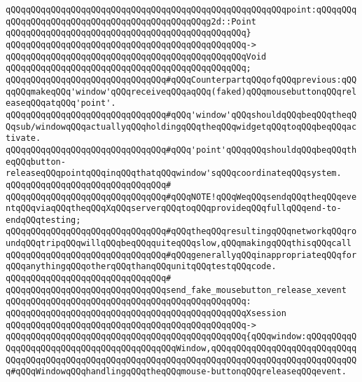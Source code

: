 \verb|qQQqqQQqqQQqqQQqqQQqqQQqqQQqqQQqqQQqqQQqqQQqqQQqqQQqqQQqpoint:qQQqqQQqqQQqqQQqqQQqqQQqqQQqqQQqqQQqqQQqqQQqqQQqg2d::Point|\newline
\verb|qQQqqQQqqQQqqQQqqQQqqQQqqQQqqQQqqQQqqQQqqQQqqQQq}|\newline
\verb|qQQqqQQqqQQqqQQqqQQqqQQqqQQqqQQqqQQqqQQqqQQqqQQq->|\newline
\verb|qQQqqQQqqQQqqQQqqQQqqQQqqQQqqQQqqQQqqQQqqQQqqQQqVoid|\newline
\verb|qQQqqQQqqQQqqQQqqQQqqQQqqQQqqQQqqQQqqQQqqQQqqQQq;|\newline
\newline
\verb|qQQqqQQqqQQqqQQqqQQqqQQqqQQqqQQq#qQQqCounterpartqQQqofqQQqprevious:qQQqqQQqmakeqQQq'window'qQQqreceiveqQQqaqQQq(faked)qQQqmousebuttonqQQqreleaseqQQqatqQQq'point'.|\newline
\verb|qQQqqQQqqQQqqQQqqQQqqQQqqQQqqQQq#qQQq'window'qQQqshouldqQQqbeqQQqtheqQQqsub/windowqQQqactuallyqQQqholdingqQQqtheqQQqwidgetqQQqtoqQQqbeqQQqactivate.|\newline
\verb|qQQqqQQqqQQqqQQqqQQqqQQqqQQqqQQq#qQQq'point'qQQqqQQqshouldqQQqbeqQQqtheqQQqbutton-releaseqQQqpointqQQqinqQQqthatqQQqwindow'sqQQqcoordinateqQQqsystem.|\newline
\verb|qQQqqQQqqQQqqQQqqQQqqQQqqQQqqQQq#|\newline
\verb|qQQqqQQqqQQqqQQqqQQqqQQqqQQqqQQq#qQQqNOTE!qQQqWeqQQqsendqQQqtheqQQqeventqQQqviaqQQqtheqQQqXqQQqserverqQQqtoqQQqprovideqQQqfullqQQqend-to-endqQQqtesting;|\newline
\verb|qQQqqQQqqQQqqQQqqQQqqQQqqQQqqQQq#qQQqtheqQQqresultingqQQqnetworkqQQqroundqQQqtripqQQqwillqQQqbeqQQqquiteqQQqslow,qQQqmakingqQQqthisqQQqcall|\newline
\verb|qQQqqQQqqQQqqQQqqQQqqQQqqQQqqQQq#qQQqgenerallyqQQqinappropriateqQQqforqQQqanythingqQQqotherqQQqthanqQQqunitqQQqtestqQQqcode.|\newline
\verb|qQQqqQQqqQQqqQQqqQQqqQQqqQQqqQQq#|\newline
\verb|qQQqqQQqqQQqqQQqqQQqqQQqqQQqqQQqsend_fake_mousebutton_release_xevent|\newline
\verb|qQQqqQQqqQQqqQQqqQQqqQQqqQQqqQQqqQQqqQQqqQQqqQQq:|\newline
\verb|qQQqqQQqqQQqqQQqqQQqqQQqqQQqqQQqqQQqqQQqqQQqqQQqXsession|\newline
\verb|qQQqqQQqqQQqqQQqqQQqqQQqqQQqqQQqqQQqqQQqqQQqqQQq->|\newline
\verb|qQQqqQQqqQQqqQQqqQQqqQQqqQQqqQQqqQQqqQQqqQQqqQQq{qQQqwindow:qQQqqQQqqQQqqQQqqQQqqQQqqQQqqQQqqQQqqQQqqQQqWindow,qQQqqQQqqQQqqQQqqQQqqQQqqQQqqQQqqQQqqQQqqQQqqQQqqQQqqQQqqQQqqQQqqQQqqQQqqQQqqQQqqQQqqQQqqQQqqQQqqQQq#qQQqWindowqQQqhandlingqQQqtheqQQqmouse-buttonqQQqreleaseqQQqevent.|\newline
